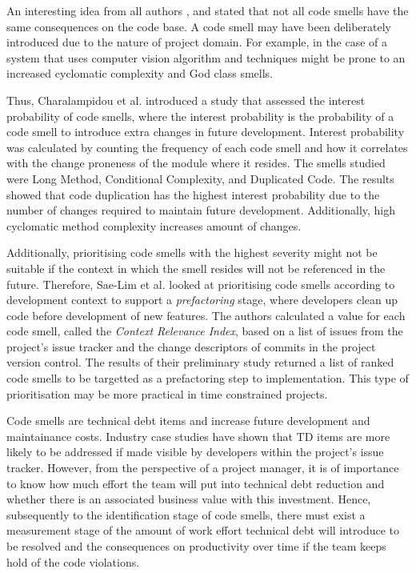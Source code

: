 \documentclass{mprop}
\begin{document}
An interesting idea from all authors \cite{Olbrich2009}, \cite{Fontana2012} and
\cite{Khomh2009} stated that not all code smells have the same consequences on
the code base. A code smell may have been deliberately introduced due to the
nature of project domain. For example, in the case of a system that uses
computer vision algorithm and techniques might be prone to an increased
cyclomatic complexity and God class smells.

Thus, Charalampidou et al. \cite{Charalampidou2017} introduced a study that
assessed the interest probability of code smells, where the interest probability
is the probability of a code smell to introduce extra changes in future
development. Interest probability was calculated by counting the frequency of
each code smell and how it correlates with the change proneness of the module
where it resides. The smells studied were Long Method, Conditional Complexity,
and Duplicated Code. The results showed that code duplication has the highest
interest probability due to the number of changes required to maintain future
development. Additionally, high cyclomatic method complexity increases amount of
changes.

Additionally, prioritising code smells with the highest severity might not be
suitable if the context in which the smell resides will not be referenced in the
future. Therefore, Sae-Lim et al. \cite{Sae-Lim2016} looked at prioritising code
smells according to development context to support a \textit{prefactoring}
stage, where developers clean up code before development of new features. The
authors calculated a value for each code smell, called the \textit{Context
	Relevance Index}, based on a list of issues from the project's issue tracker and
the change descriptors of commits in the project version control. The results of
their preliminary study returned a list of ranked code smells to be targetted as
a prefactoring step to implementation. This type of prioritisation may be more
practical in time constrained projects.

Code smells are technical debt items and increase future development and
maintainance costs. Industry case studies have shown that TD items are more
likely to be addressed if made visible by developers within the project's issue
tracker. However, from the perspective of a project manager, it is of importance
to know how much effort the team will put into technical debt reduction and
whether there is an associated business value with this investment. Hence,
subsequently to the identification stage of code smells, there must exist a
measurement stage of the amount of work effort technical debt will introduce to
be resolved and the consequences on productivity over time if the team keeps
hold of the code violations.
\end{document}
